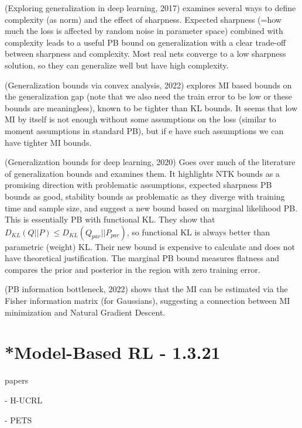 \documentclass[letterpaper]{article}
\theoremstyle{definition}
\begin{document}
(Exploring generalization in deep learning, 2017) examines several ways to define complexity (as norm) and the effect of sharpness. Expected sharpness (=how much the loss is affected by random noise in parameter space) combined with complexity leads to a useful PB bound on generalization with a clear trade-off between sharpness and complexity. Most real nets converge to a low sharpness solution, so they can generalize well but have high complexity.

(Generalization bounds via convex analysis, 2022) explores MI based bounds on the generalization gap (note that we also need the train error to be low or these bounds are meaningless), known to be tighter than KL bounds. It seems that low MI by itself is not enough without some assumptions on the loss (similar to moment assumptions in standard PB), but if e have such assumptions we can have tighter MI bounds.

(Generalization bounds for deep learning, 2020) Goes over much of the literature of generalization bounds and examines them. It highlights NTK bounds as a promising direction with problematic assumptions, expected sharpness PB bounds as good, stability bounds as problematic as they diverge with training time and sample size, and suggest a new bound based on marginal likelihood PB. This is essentially PB with functional KL. They show that $D_{KL}(Q||P)\leq D_{KL}(Q_{par}||P_{par})$, so functional KL is always better than parametric (weight) KL. Their new bound is expensive to calculate and does not have theoretical justification. The marginal PB bound measures flatness and compares the prior and posterior in the region with zero training error.

(PB information bottleneck, 2022) shows that the MI can be estimated via the Fisher information matrix (for Gaussians), suggesting a connection between MI minimization and Natural Gradient Descent.


\section{*Model-Based RL - 1.3.21} \label{sec:mbrl}

papers

\cite{Curi2020} - H-UCRL

\cite{Chua2018} - PETS
\end{document}

